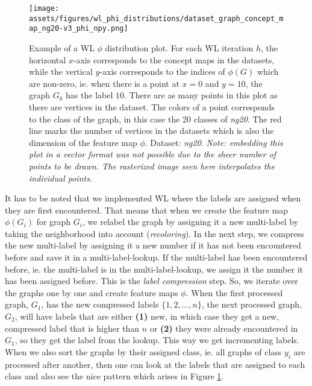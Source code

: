 \begin{figure}[htb!]
	\centering
	{\texttt{[image: assets/figures/wl\_phi\_distributions/dataset\_graph\_concept\_map\_ng20-v3\_phi\_npy.png]}
		\caption[Example: $\phi$ distribution plot]{%
			Example of a WL $\phi$ distribution plot.
			For each WL iteration $h$, the horizontal $x$-axis corresponds to the concept maps in the datasets, while the vertical $y$-axis corresponds to the indices of $\phi(G)$ which are non-zero, ie. when there is a point at $x=0$ and $y=10$, the graph $G_0$ has the label $10$.
			There are as many points in this plot as there are vertices in the dataset.
			The colors of a point corresponds to the class of the graph, in this case the 20 classes of \textit{ng20}.
			The red line marks the number of vertices in the datasets which is also the dimension of the feature map $\phi$.
			Dataset: \textit{ng20}.
			\textit{Note: embedding this plot in a vector format  was not possible due to the sheer number of points to be drawn. The rasterized image seen here interpolates the individual points.}
		}%
		\label{fig:phi_distribution_example}}
\end{figure}

It has to be noted that we implemented WL where the labels are assigned when they are first encountered. That means that when we create the feature map $\phi(G_i)$ for graph $G_i$, we relabel the graph by assigning it a new multi-label by taking the neighborhood into account (\textit{recoloring}). In the next step, we compress the new multi-label by assigning it a new number if it has not been encountered before and save it in a multi-label-lookup. If the multi-label has been encountered before, ie. the multi-label is in the multi-label-lookup, we assign it the number it has been assigned before.
This is the \textit{label compression} step.
So, we iterate over the graphs one by one and create feature maps $\phi$.
When the first processed graph, $G_1$, has the new compressed labels $\{1, 2, \ldots, n\}$, the next processed graph, $G_2$, will have labels that are either \textbf{(1)} new, in which case they get a new, compressed label that is higher than $n$ or \textbf{(2)} they were already encountered in $G_1$, so they get the label from the lookup.
This way we get incrementing labels.
When we also sort the graphs by their assigned class, ie. all graphs of class $y_i$ are processed after another, then one can look at the labels that are assigned to each class and also see the nice pattern which arises in Figure \ref{fig:phi_distribution_example}.

